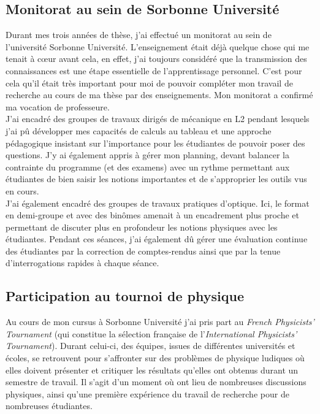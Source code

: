 \documentclass[a4paper,11pt]{article} %
\newcommand{\pointmedian}{\fontfamily{cmr}\selectfont\textperiodcentered}
\begin{document}
	\subsection{Monitorat au sein de Sorbonne Université}
	Durant mes trois années de thèse, j'ai effectué un monitorat au sein de l'université Sorbonne Université. L'enseignement était déjà quelque chose qui me tenait à cœur avant cela, en effet, j'ai toujours considéré que la transmission des connaissances est une étape essentielle de l'apprentissage personnel. C'est pour cela qu'il était très important pour moi de pouvoir compléter mon travail de recherche au cours de ma thèse par des enseignements. Mon monitorat a confirmé ma vocation de professeure.\\ 
	
	J'ai encadré des groupes de travaux dirigés de mécanique en L2 pendant lesquels j'ai pû développer mes capacités de calculs au tableau et une approche pédagogique insistant sur l'importance pour les étudiant\pointmedian es de pouvoir poser des questions. J'y ai également appris à gérer mon planning, devant balancer la contrainte du programme (et des examens) avec un rythme permettant aux étudiant\pointmedian es de bien saisir les notions importantes et de s'approprier les outils vus en cours.\\
	
	J'ai également encadré des groupes de travaux pratiques d'optique. Ici, le format en demi-groupe et avec des binômes amenait à un encadrement plus proche et permettant de discuter plus en profondeur les notions physiques avec les étudiant\pointmedian es. Pendant ces séances, j'ai également dû gérer une évaluation continue des étudiant\pointmedian es par la correction de comptes-rendus ainsi que par la tenue d'interrogations rapides à chaque séance.\\
	
	\subsection{Participation au tournoi de physique}
	Au cours de mon cursus à Sorbonne Université j'ai pris part au \textit{French Physicists' Tournament} (qui constitue la sélection française de l'\textit{International Physicists' Tournament}). Durant celui-ci, des équipes, issues de différentes universités et écoles, se retrouvent pour \textgravedbl s'affronter\textacutedbl{} sur des problèmes de physique ludiques où elles doivent présenter et critiquer les résultats qu'elles ont obtenus durant un semestre de travail. Il s'agit d'un moment où ont lieu de nombreuses discussions physiques, ainsi qu'une première expérience du travail de recherche pour de nombreu\pointmedian ses étudiant\pointmedian es.\\
	
\end{document}

